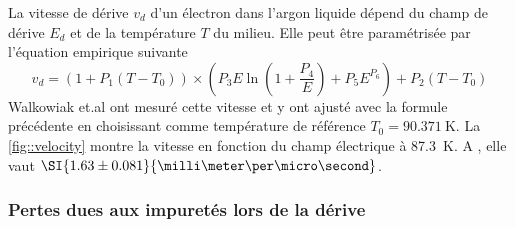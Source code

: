         La vitesse de dérive $v_d$ d'un électron dans l'argon liquide dépend du champ de dérive $E_d$ et de la température $T$ du milieu. Elle peut être paramétrisée par l'équation empirique suivante\cite{Gonidec1996}
        \begin{equation}\label{eq::velocity}
          v_d = \left(1+P_1(T-T_0)\right)\times\left(P_3E\ln\left(1+\frac{P_4}{E}\right)+P_5E^{P_6}\right) + P_2(T-T_0)
        \end{equation}
        Walkowiak et.al\cite{Walkowiak2000} ont mesuré cette vitesse et y ont ajusté avec la formule précédente en choisissant comme température de référence $T_0=\SI{90.371}{\kelvin}$.%
        La \autoref{fig::velocity} montre la vitesse en fonction du champ électrique à \SI{87.3}{\kelvin}. A \driftfield{}, elle vaut $\SI{1.63\pm0.081}{\milli\meter\per\micro\second}$.

      \subsubsection{Pertes dues aux impuretés lors de la dérive}\label{sec::purity}
        
